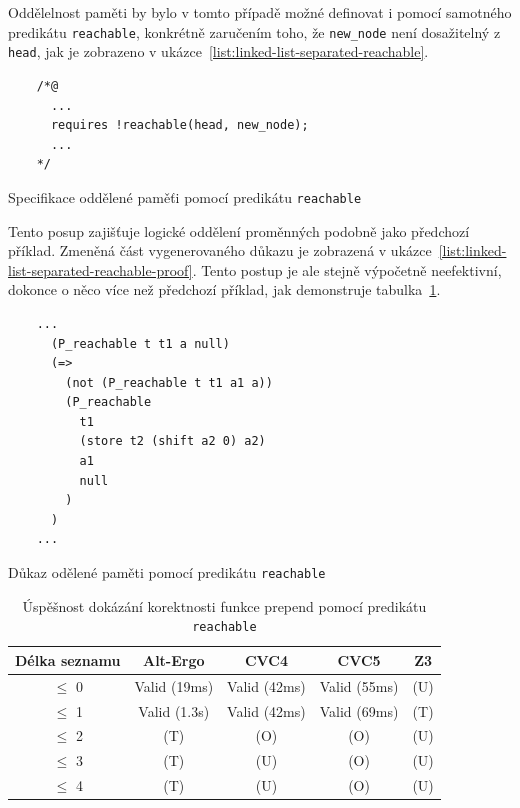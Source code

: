 Oddělelnost paměti by bylo v tomto případě možné definovat
i pomocí samotného predikátu \texttt{reachable},
konkrétně zaručením toho, že \texttt{new\_node} není dosažitelný z \texttt{head},
jak je zobrazeno v ukázce~\ref{list:linked-list-separated-reachable}.

\begin{listing}[H]
    \begin{verbatim}
    /*@
      ...
      requires !reachable(head, new_node);
      ...
    */
    \end{verbatim}
    \caption{Specifikace oddělené paměťi pomocí predikátu \texttt{reachable}}
    \label{list:linked-list-separated-reachable}
\end{listing}

Tento posup zajišťuje logické oddělení proměnných podobně jako předchozí příklad.
Zmeněná část vygenerovaného důkazu je zobrazená v ukázce~\ref{list:linked-list-separated-reachable-proof}.
Tento postup je ale stejně výpočetně neefektivní, dokonce o něco více než předchozí příklad,
jak demonstruje tabulka~\ref{tab:prepend-smt-success-reachable}.

\begin{listing}[H]
    \begin{verbatim}
    ...
      (P_reachable t t1 a null)
      (=>
        (not (P_reachable t t1 a1 a))
        (P_reachable
          t1
          (store t2 (shift a2 0) a2)
          a1
          null
        )
      )
    ...
    \end{verbatim}
    \caption{Důkaz odělené paměti pomocí predikátu \texttt{reachable}}
    \label{list:linked-list-separated-reachable-proof}
\end{listing}

\begin{table}[H]
    \centering
    \begin{tabular}{|c|c|c|c|c|}
        \hline
        Délka seznamu & Alt-Ergo     & CVC4         & CVC5         & Z3  \\
        \hline
        $\leq$ 0      & Valid (19ms) & Valid (42ms) & Valid (55ms) & (U) \\
        $\leq$ 1      & Valid (1.3s) & Valid (42ms) & Valid (69ms) & (T) \\
        $\leq$ 2      & (T)          & (O)          & (O)          & (U) \\
        $\leq$ 3      & (T)          & (U)          & (O)          & (U) \\
        $\leq$ 4      & (T)          & (U)          & (O)          & (U) \\
        \hline
    \end{tabular}
    \caption{Úspěšnost dokázání korektnosti funkce prepend pomocí predikátu \texttt{reachable}}
    \label{tab:prepend-smt-success-reachable}
\end{table}

